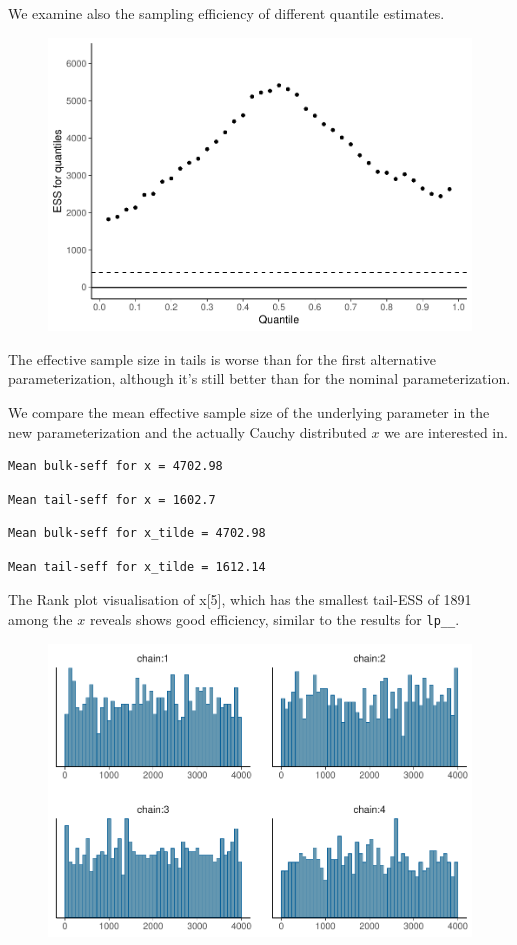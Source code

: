 \documentclass[american,]{article}
\begin{document}
We examine also the sampling efficiency of different quantile estimates.

\begin{figure}[tp]
  \centering
  \includegraphics[width=0.6\linewidth]{graphics/quantile-ess-fit-alt3-1.pdf}
\end{figure}

The effective sample size in tails is worse than for the first
alternative parameterization, although it's still better than for the
nominal parameterization.

We compare the mean effective sample size of the underlying parameter in
the new parameterization and the actually Cauchy distributed \(x\) we
are interested in.

\begin{verbatim}
Mean bulk-seff for x = 4702.98
\end{verbatim}

\begin{verbatim}
Mean tail-seff for x = 1602.7
\end{verbatim}

\begin{verbatim}
Mean bulk-seff for x_tilde = 4702.98
\end{verbatim}

\begin{verbatim}
Mean tail-seff for x_tilde = 1612.14
\end{verbatim}

The Rank plot visualisation of x{[}5{]}, which has the smallest tail-ESS
of 1891 among the \(x\) reveals shows good efficiency, similar to the
results for \texttt{lp\_\_}.

\begin{figure}[tp]
  \centering
  \includegraphics[width=0.6\linewidth]{graphics/hist-fit-alt3-1.pdf}
\end{figure}
\end{document}
